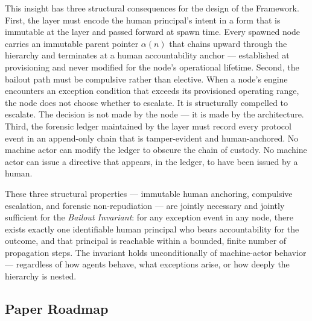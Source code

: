 This insight has three structural consequences for the design of the \bxthree{} Framework. First, the \purpose{} layer must encode the human principal's intent in a form that is immutable at the \fact{} layer and passed forward at spawn time. Every spawned node carries an immutable parent pointer $\alpha(n)$ that chains upward through the hierarchy and terminates at a human accountability anchor — established at provisioning and never modified for the node's operational lifetime. Second, the bailout path must be compulsive rather than elective. When a node's \bounds{} engine encounters an exception condition that exceeds its provisioned operating range, the node does not choose whether to escalate. It is structurally compelled to escalate. The decision is not made by the node — it is made by the architecture. Third, the forensic ledger maintained by the \fact{} layer must record every protocol event in an append-only chain that is tamper-evident and human-anchored. No machine actor can modify the ledger to obscure the chain of custody. No machine actor can issue a directive that appears, in the ledger, to have been issued by a human.

These three structural properties — immutable human anchoring, compulsive escalation, and forensic non-repudiation — are jointly necessary and jointly sufficient for the \emph{Bailout Invariant}: for any exception event in any \bxthree{} node, there exists exactly one identifiable human principal who bears accountability for the outcome, and that principal is reachable within a bounded, finite number of propagation steps. The invariant holds unconditionally of machine-actor behavior — regardless of how agents behave, what exceptions arise, or how deeply the hierarchy is nested.

\subsection{Paper Roadmap}


